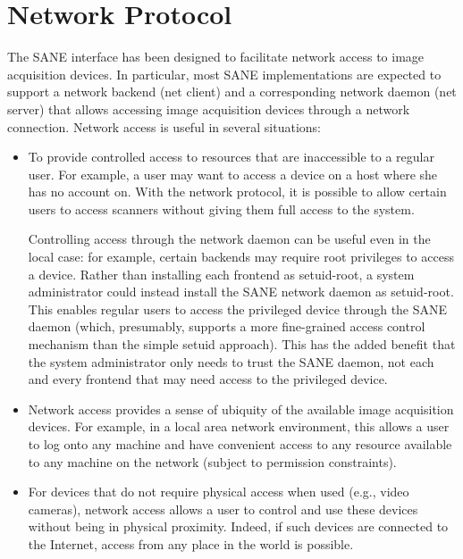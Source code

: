 \chapter{Network Protocol}\label{chap:net}

The SANE interface has been designed to facilitate network access to
image acquisition devices.  In particular, most SANE implementations
are expected to support a network backend (net client) and a
corresponding network daemon (net server) that allows accessing image
acquisition devices through a network connection.  Network access is
useful in several situations:
\begin{itemize}

\item To provide controlled access to resources that are inaccessible
  to a regular user.  For example, a user may want to access a device
  on a host where she has no account on.  With the network protocol,
  it is possible to allow certain users to access scanners without
  giving them full access to the system.

  Controlling access through the network daemon can be useful even in
  the local case: for example, certain backends may require root
  privileges to access a device.  Rather than installing each frontend
  as setuid-root, a system administrator could instead install the
  SANE network daemon as setuid-root.  This enables regular users to
  access the privileged device through the SANE daemon (which,
  presumably, supports a more fine-grained access control mechanism
  than the simple setuid approach).  This has the added benefit that
  the system administrator only needs to trust the SANE daemon, not
  each and every frontend that may need access to the privileged
  device.

\item Network access provides a sense of ubiquity of the available
  image acquisition devices.  For example, in a local area network
  environment, this allows a user to log onto any machine and have
  convenient access to any resource available to any machine on the
  network (subject to permission constraints).

\item For devices that do not require physical access when used (e.g.,
  video cameras), network access allows a user to control and use
  these devices without being in physical proximity.  Indeed, if such
  devices are connected to the Internet, access from any place in the
  world is possible.

\end{itemize}

